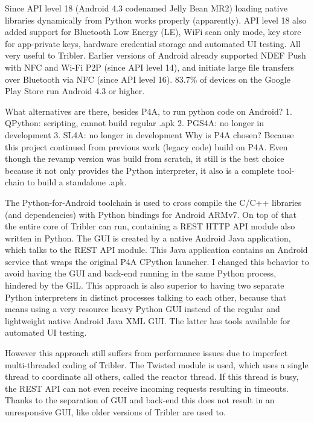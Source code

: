 Since API level 18 (Android 4.3 codenamed Jelly Bean MR2) loading native libraries dynamically from Python works properly (apparently).
API level 18 also added support for Bluetooth Low Energy (LE), WiFi scan only mode, key store for app-private keys, hardware credential storage and automated UI testing.
All very useful to Tribler.
Earlier versions of Android already supported NDEF Push with NFC and Wi-Fi P2P (since API level 14), and initiate large file transfers over Bluetooth via NFC (since API level 16).
83.7\% of devices on the Google Play Store run Android 4.3 or higher.


What alternatives are there, besides P4A, to run python code on Android?
1. QPython: scripting, cannot build regular .apk
2. PGS4A: no longer in development
3. SL4A: no longer in development
Why is P4A chosen?
Because this project continued from previous work (legacy code) build on P4A.
Even though the revamp version was build from scratch, it still is the best choice because it not only provides the Python interpreter, it also is a complete tool-chain to build a standalone .apk.

The Python-for-Android toolchain is used to cross compile the C/C++ libraries (and dependencies) with Python bindings for Android ARMv7.
On top of that the entire core of Tribler can run, containing a REST HTTP API module also written in Python.
The GUI is created by a native Android Java application, which talks to the REST API module.
This Java application contains an Android service that wraps the original P4A CPython launcher.
I changed this behavior to avoid having the GUI and back-end running in the same Python process, hindered by the GIL.
This approach is also superior to having two separate Python interpreters in distinct processes talking to each other, because that means using a very resource heavy Python GUI instead of the regular and lightweight native Android Java XML GUI.
The latter has tools available for automated UI testing.


However this approach still suffers from performance issues due to imperfect multi-threaded coding of Tribler.
The Twisted module is used, which uses a single thread to coordinate all others, called the reactor thread.
If this thread is busy, the REST API can not even receive incoming requests resulting in timeouts.
Thanks to the separation of GUI and back-end this does not result in an unresponsive GUI, like older versions of Tribler are used to.


